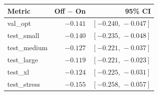 \begin{tabular}{lrr}
\toprule
Metric & Off $-$ On & 95\% CI \\
\midrule
val\_opt & $-0.141$ & $[-0.240,\,-0.047]$ \\
test\_small & $-0.140$ & $[-0.235,\,-0.048]$ \\
test\_medium & $-0.127$ & $[-0.221,\,-0.037]$ \\
test\_large & $-0.119$ & $[-0.221,\,-0.023]$ \\
test\_xl & $-0.124$ & $[-0.225,\,-0.031]$ \\
test\_stress & $-0.155$ & $[-0.258,\,-0.057]$ \\
\bottomrule
\end{tabular}
